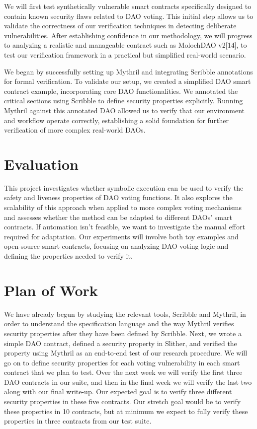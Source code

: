 \documentclass[conference]{IEEEtran}
\begin{document}
We will first test synthetically vulnerable smart contracts specifically designed to contain known security flaws related to DAO voting. This initial step allows us to validate the correctness of our verification techniques in detecting deliberate vulnerabilities. After establishing confidence in our methodology, we will progress to analyzing a realistic and manageable contract such as MolochDAO v2[14], to test our verification framework in a practical but simplified real-world scenario.

We began by successfully setting up Mythril and integrating Scribble annotations for formal verification. To validate our setup, we created a simplified DAO smart contract example, incorporating core DAO functionalities. We annotated the critical sections using Scribble to define security properties explicitly. Running Mythril against this annotated DAO allowed us to verify that our environment and workflow operate correctly, establishing a solid foundation for further verification of more complex real-world DAOs.



\section{Evaluation}

This project investigates whether symbolic execution can be used to verify the safety and liveness properties of DAO voting functions. It also explores the scalability of this approach when applied to more complex voting mechanisms and assesses whether the method can be adapted to different DAOs' smart contracts. If automation isn't feasible, we want to investigate the manual effort required for adaptation. Our experiments will involve both toy examples and open-source smart contracts, focusing on analyzing DAO voting logic and defining the properties needed to verify it.

\section{Plan of Work}
We have already begun by studying the relevant tools, Scribble and Mythril, in order to understand the specification language and the way Mythril verifies security properties after they have been defined by Scribble. Next, we wrote a simple DAO contract, defined a security property in Slither, and verified the property using Mythril as an end-to-end test of our research procedure. We will go on to define security properties for each voting vulnerability in each smart contract that we plan to test. Over the next week we will verify the first three DAO contracts in our suite, and then in the final week we will verify the last two along with our final write-up. Our expected goal is to verify three different security properties in these five contracts. Our stretch goal would be to verify these properties in 10 contracts, but at minimum we expect to fully verify these properties in three contracts from our test suite.
\end{document}
